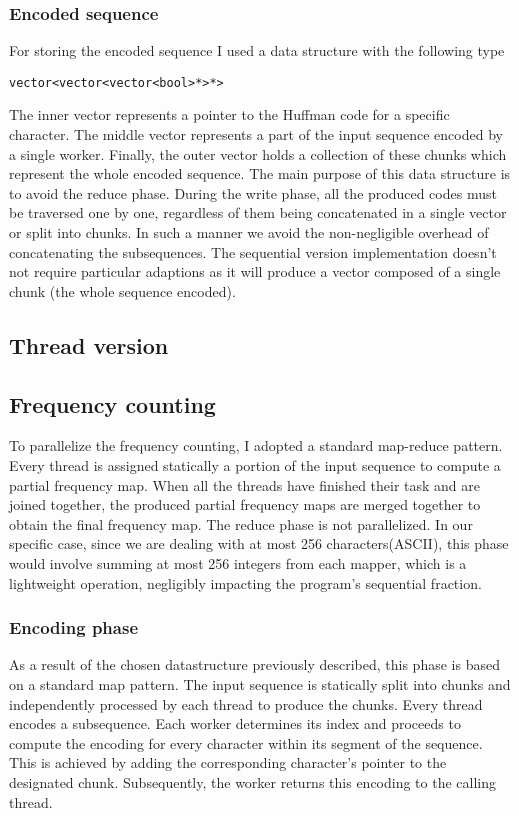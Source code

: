 \documentclass{article}
\begin{document}
\subsubsection{Encoded sequence}
For storing the encoded sequence I used a data structure with the following type
\begin{verbatim}
vector<vector<vector<bool>*>*>
\end{verbatim}
The inner vector represents a
pointer to the Huffman code for a specific character. The middle vector
represents a part of the input sequence encoded by a single worker.
Finally, the outer vector holds a collection of these chunks which represent
the whole encoded sequence.
The main purpose of this data structure is to avoid the reduce phase.
During the write phase, all the produced codes must be traversed one by one, regardless
of them being concatenated in a single vector or split into chunks. In such a manner we
avoid the non-negligible overhead of concatenating the subsequences.
The sequential version implementation doesn't not require particular adaptions as it
will produce a vector composed of a single chunk (the whole sequence encoded).

\subsection{Thread version}
\subsection{Frequency counting}
To parallelize the frequency counting, I adopted a standard
map-reduce pattern. Every thread is assigned statically a portion of
the input sequence to compute a partial frequency map.
When all the threads have finished their task and are joined together,
the produced partial frequency maps are merged together to obtain the final
frequency map. The reduce phase is not parallelized.
In our specific case, since we are dealing with at most 256 characters(ASCII),
this phase would involve summing at most 256 integers from
each mapper, which is a lightweight operation, negligibly impacting the program's
sequential fraction.
\subsubsection{Encoding phase}
As a result of the chosen datastructure
previously described, this phase is based on a standard map pattern.
The input sequence is statically split into chunks and
independently processed by each thread to produce the chunks. Every
thread encodes a subsequence.
Each worker determines its index and proceeds
to compute the encoding for every character within its segment of the sequence.
This is achieved by adding the corresponding character's pointer to the designated
chunk. Subsequently, the worker returns this encoding to the calling thread.
\end{document}
